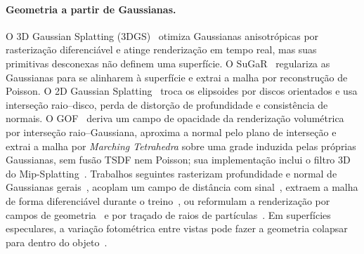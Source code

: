\documentclass[12pt]{article}
\begin{document}
\paragraph{Geometria a partir de Gaussianas.}
O 3D Gaussian Splatting (3DGS)~\cite{kerbl2023gaussian} otimiza Gaussianas anisotrópicas por rasterização diferenciável e atinge renderização em tempo real, mas suas primitivas desconexas não definem uma superfície.
O SuGaR~\cite{guedon2024sugar} regulariza as Gaussianas para se alinharem à superfície e extrai a malha por reconstrução de Poisson.
O 2D Gaussian Splatting~\cite{huang2024twodgs} troca os elipsoides por discos orientados e usa interseção raio--disco, perda de distorção de profundidade e consistência de normais.
O GOF~\cite{yu2024gof} deriva um campo de opacidade da renderização volumétrica por interseção raio--Gaussiana, aproxima a normal pelo plano de interseção e extrai a malha por \emph{Marching Tetrahedra} sobre uma grade induzida pelas próprias Gaussianas, sem fusão TSDF nem Poisson; sua implementação inclui o filtro 3D do Mip-Splatting~\cite{yu2024mipsplatting}.
Trabalhos seguintes rasterizam profundidade e normal de Gaussianas gerais~\cite{zhang2024radegs}, acoplam um campo de distância com sinal~\cite{lyu2024dgsr}, extraem a malha de forma diferenciável durante o treino~\cite{guedon2025milo}, ou reformulam a renderização por campos de geometria~\cite{jiang2025geometryfield} e por traçado de raios de partículas~\cite{moenne2024gaussianrt}.
Em superfícies especulares, a variação fotométrica entre vistas pode fazer a geometria colapsar para dentro do objeto~\cite{li2026pdrgs}.
\end{document}
